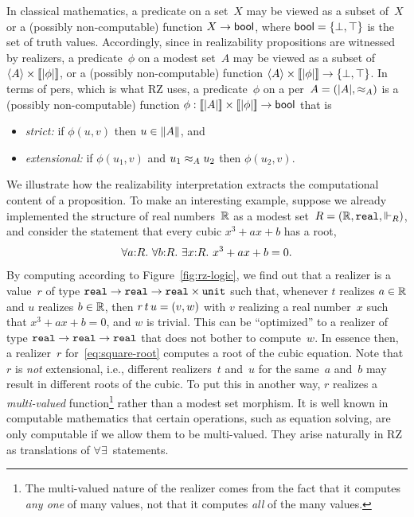In classical mathematics, a predicate on a set~$X$ may be viewed as a
subset of~$X$ or a (possibly non-computable) function $X \to \mathsf{bool}$,
where $\mathsf{bool} = \{\bot, \top\}$ is the set of truth values.
Accordingly, since in realizability propositions are witnessed by
realizers, a predicate~$\phi$ on a modest set~$A$ may be viewed as a
subset of $\langle A \rangle \times [\![|\phi|]\!]$, or a (possibly
non-computable) function $\langle A \rangle \times [\![|\phi|]\!] \to
\{\bot, \top\}$. In terms of pers, which is what RZ uses, a
predicate~$\phi$ on a per~$A = (|A|, {\approx_A})$ is a (possibly
non-computable) function $\phi : [\![|A|]\!] \times
[\![|\phi|]\!] \to \mathsf{bool}$ that is
%
\begin{itemize}
\item \emph{strict:} if $\phi(u,v)$ then $u \in \|A\|$, and
\item \emph{extensional:} if $\phi(u_1,v)$ and $u_1 \approx_A u_2$ then
  $\phi(u_2,v)$.
\end{itemize}

We illustrate how the realizability interpretation extracts the
computational content of a proposition. To make an interesting
example, suppose we already implemented the structure of real
numbers~$\mathbb{R}$ as a modest set~$R = (\mathbb{R}, \mathtt{real}, {\Vdash_R})$, and
consider the statement that every cubic $x^3 + a x + b$ has a root,
%
\begin{equation}
  \label{eq:square-root}%
  \iforall{a}{R}{\iforall{b}{R}{\iexists{x}{R}{\iequal{x^3 + a x + b}{0}}}}.
\end{equation}
%
By computing according to Figure~\ref{fig:rz-logic}, we find out that
a realizer is a value~$r$ of type
$\mathtt{real} \to \mathtt{real} \to \mathtt{real} \times \mathtt{unit}$
such that, whenever $t$ realizes $a \in \mathbb{R}$ and $u$ realizes $b \in
\mathbb{R}$, then $r\,t\,u = (v, w)$ with $v$ realizing a real
number~$x$ such that $x^3 + a x + b = 0$, and $w$ is trivial. This
can be ``optimized'' to a realizer of type
$\mathtt{real} \to \mathtt{real} \to \mathtt{real}$ that
does not bother to compute~$w$. In essence then, a realizer~$r$
for~\eqref{eq:square-root} computes a root of the cubic equation. Note
that $r$ is \emph{not} extensional, i.e., different realizers~$t$
and~$u$ for the same~$a$ and~$b$ may result in different roots of the
cubic. To put this in another way, $r$ realizes a \emph{multi-valued}
function\footnote{The multi-valued nature of the realizer comes from
  the fact that it computes \emph{any one} of many values, not that it
  computes \emph{all} of the many values.} rather than a modest set
morphism. It is well known in computable mathematics that certain
operations, such as equation solving, are only computable if we allow
them to be multi-valued. They arise naturally in RZ as translations of
$\forall\exists$~statements.

